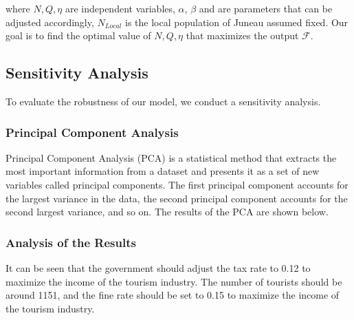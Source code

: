 where $N,Q,\eta$ are independent variables, $\alpha$, $\beta$ 
and are parameters that can be adjusted accordingly, 
$N_{Local}$ is the local population of Juneau assumed fixed.
Our goal is to find the optimal value of $N,Q,\eta$ that maximizes the output $\mathcal{F}$.

\subsection{Sensitivity Analysis}

To evaluate the robustness of our model, we conduct a sensitivity analysis.

\subsubsection{Principal Component Analysis}

Principal Component Analysis (PCA) is a statistical method that
extracts the most important information from a dataset and
presents it as a set of new variables called principal components.
The first principal component accounts for the largest variance in the data,
the second principal component accounts for the second largest variance, and so on.
The results of the PCA are shown below.


\subsubsection{Analysis of the Results}

It can be seen that the government should adjust the tax rate to 0.12 to 
maximize the income of the tourism industry. The number of tourists should be
around 1151, and the fine rate should be set to 0.15 to maximize the income of the tourism industry.